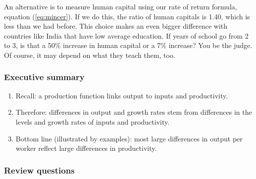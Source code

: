 \documentclass[letterpaper,12pt]{article}
\begin{document}
An alternative is to measure human capital using our
rate of return formula, equation (\ref{eq:mincer}).
If we do this, the ratio of human capitals is 1.40,
which is less than we had before.
This choice makes an even bigger difference with countries
like India that have low average education.
If years of school go from 2 to 3, is that a 50\% increase
in human capital or a 7\% increase?
You be the judge.
Of course, it may depend on what they teach them, too.


\subsubsection*{Executive summary}

\begin{enumerate}
\item Recall:  a production function links output to inputs and productivity.

\item Therefore:  differences in output and growth rates
stem from differences in the levels and growth rates
of inputs and productivity.

\item Bottom line (illustrated by examples):  
most large differences in output per worker reflect
large differences in productivity.  

\end{enumerate}



\subsubsection*{Review questions}
\end{document}
